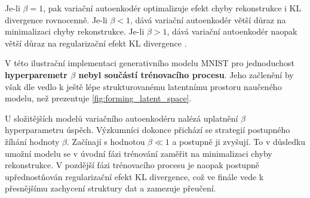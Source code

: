 Je-li $\beta = 1$, pak variační autoenkodér optimalizuje efekt chyby rekonstrukce i KL divergence rovnocenně.   
Je-li $\beta < 1$, dává variační autoenkodér větší důraz na minimalizaci chyby rekonstrukce.
Je-li $\beta > 1$, dává variační autoenkodér naopak větší důraz na regularizační efekt KL divergence \cite{Higgins2022}.

V této ilustrační implementaci generativního modelu MNIST pro jednoduchost \textbf{hyperparemetr $\beta$ nebyl součástí trénovacího procesu}.
Jeho začlenění by však dle \textcite{Higgins2022} vedlo k ještě lépe strukturovanému latentnímu prostoru naučeného modelu, než prezentuje \autoref{fig:forming_latent_space}.

U složitějších modelů variačního autoenkodéru nalézá uplatnění $\beta$ hyperparametru úspěch.
Výzkumníci \textcite{Sankarapandian2021} dokonce přichází se strategií postupného žíhání hodnoty $\beta$.
Začínají s hodnotou $\beta \ll 1$ a postupně ji zvyšují.
To v důsledku umožní modelu se v úvodní fázi trénování zaměřit na minimalizaci chyby rekonstrukce.
V pozdější fázi trénovacího procesu je naopak postupně upřednostňován regularizační efekt KL divergence, což ve finále vede k přesnějšímu zachycení struktury dat a zamezuje přeučení.

